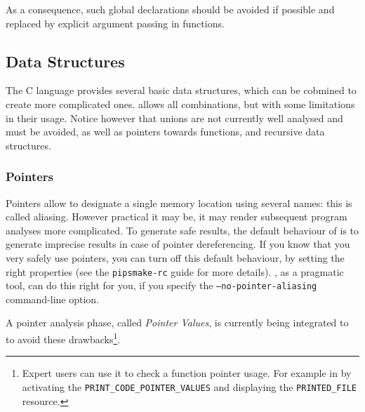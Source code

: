 \documentclass[a4paper]{article}
\begin{document}
As a consequence, such global declarations should be avoided if
possible and replaced by explicit argument passing in functions.



\subsection{Data Structures}
\label{sec:data_structures}

The C language provides several basic data structures, which can be
cobmined to create more complicated ones. \Apips allows all
combinations, but with some limitations in their usage. Notice however
that unions are not currently well analysed and must be avoided, as
well as pointers towards functions, and recursive data structures.


\subsubsection{Pointers}
\label{sec:pointers}

Pointers allow to designate a single memory location using several
names: this is called aliasing. However practical it may be, it may
render subsequent program analyses more complicated. To generate safe
results, the default behaviour of \Apips is to generate imprecise
results in case of pointer dereferencing. If you know that you very
safely use pointers, you can turn off this default behaviour, by
setting the right properties (see the \texttt{pipsmake-rc} guide for
more details). \Apfa, as a pragmatic tool, can do this right for you,
if you specify the \texttt{--no-pointer-aliasing} command-line option.

A pointer analysis phase, called \emph{Pointer Values}, is currently being
integrated to \Apips to avoid these drawbacks\footnote{Expert users can
  use it to check a function pointer usage. For example in \Apips by
  activating the \texttt{PRINT\_CODE\_POINTER\_VALUES} and displaying the
  \texttt{PRINTED\_FILE} resource.}.
\end{document}
